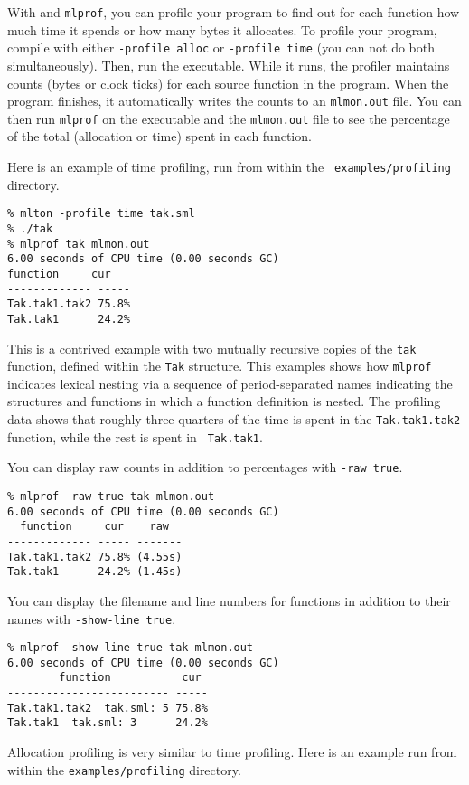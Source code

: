 
With {\mlton} and {\tt mlprof}, you can profile your program to find
out for each function how much time it spends or how many bytes it
allocates.  To profile your program, compile with either {\tt -profile
alloc} or {\tt -profile time} (you can not do both simultaneously).
Then, run the executable.  While it runs, the profiler maintains
counts (bytes or clock ticks) for each source function in the program.
When the program finishes, it automatically writes the counts to an
{\tt mlmon.out} file.  You can then run {\tt mlprof} on the executable
and the {\tt mlmon.out} file to see the percentage of the total
(allocation or time) spent in each function.

Here is an example of time profiling, run from within the {\tt
examples/profiling} directory.
\begin{verbatim}
% mlton -profile time tak.sml
% ./tak
% mlprof tak mlmon.out
6.00 seconds of CPU time (0.00 seconds GC)
function     cur 
------------- -----
Tak.tak1.tak2 75.8%
Tak.tak1      24.2%
\end{verbatim}
This is a contrived example with two mutually recursive copies of the
{\tt tak} function, defined within the {\tt Tak} structure.  This
examples shows how {\tt mlprof} indicates lexical nesting via a
sequence of period-separated names indicating the structures and
functions in which a function definition is nested.  The profiling
data shows that roughly three-quarters of the time is spent in the
{\tt Tak.tak1.tak2} function, while the rest is spent in {\tt
Tak.tak1}.

You can display raw counts in addition to percentages with {\tt -raw
true}.
\begin{verbatim}
% mlprof -raw true tak mlmon.out
6.00 seconds of CPU time (0.00 seconds GC)
  function     cur    raw  
------------- ----- -------
Tak.tak1.tak2 75.8% (4.55s)
Tak.tak1      24.2% (1.45s)
\end{verbatim}

You can display the filename and line numbers for functions in addition
to their names with {\tt -show-line true}.
\begin{verbatim}
% mlprof -show-line true tak mlmon.out
6.00 seconds of CPU time (0.00 seconds GC)
        function           cur 
------------------------- -----
Tak.tak1.tak2  tak.sml: 5 75.8%
Tak.tak1  tak.sml: 3      24.2%
\end{verbatim}

Allocation profiling is very similar to time profiling.  Here is an
example run from within the {\tt examples/profiling} directory.

